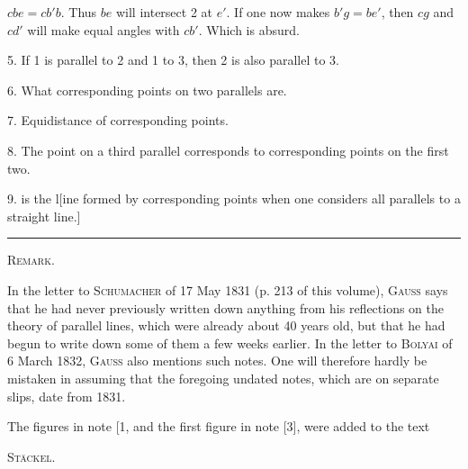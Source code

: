 $cbe = cb'b$. Thus $be$ will intersect 2 at $e'$. If one now makes $b'g = be'$, then $cg$ and $cd'$ will make equal angles with $cb'$. Which is absurd.

5. If 1 is parallel to 2 and 1 to 3, then 2 is also parallel to 3.

6. What corresponding points on two parallels are.

7. Equidistance of corresponding points.

8. The point on a third parallel corresponds to corresponding points on the first two.

9.  is the l[ine formed by corresponding points when one considers all parallels to a straight line.]

\bigskip
\begin{center}
\rule{2.5cm}{0.4pt}

\textsc{Remark.}
\end{center}

In the letter to \textsc{Schumacher} of 17 May 1831 (p. 213 of this volume), \textsc{Gauss} says that he had never previously written down anything from his reflections on the theory of parallel lines, which were already about 40 years old, but that he had begun to write down some of them a few weeks earlier. In the letter to \textsc{Bolyai} of 6 March 1832, \textsc{Gauss} also mentions such notes. One will therefore hardly be mistaken in assuming that the foregoing undated notes, which are on separate slips, date from 1831.

The figures in note [1, and the first figure in note [3], were added to the text

\hfill \textsc{Stäckel}.

